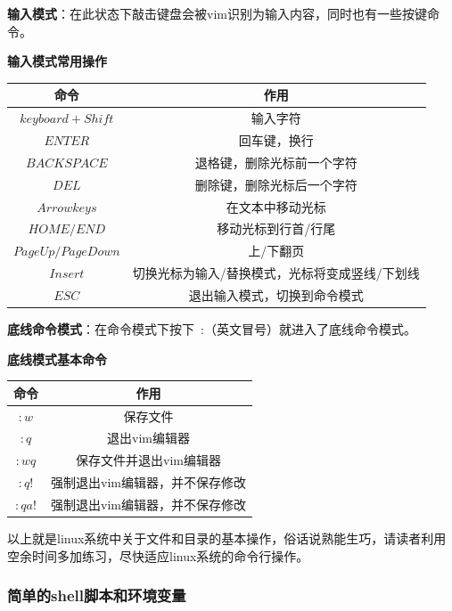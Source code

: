 \textbf{输入模式}：在此状态下敲击键盘会被vim识别为输入内容，同时也有一些按键命令。

\begin{center}
\textbf{输入模式常用操作}

	\begin{tabular}{cc}
		\toprule[1.5pt]
		命令 & 作用\\
		\midrule[1pt]
		$  keyboard+Shift    $		&输入字符\\
		$  ENTER    $		&回车键，换行\\
		$  BACK SPACE    $		&退格键，删除光标前一个字符\\
		$  DEL    $		&删除键，删除光标后一个字符\\
		$  Arrow keys    $		&在文本中移动光标\\
		$  HOME/END    $		&移动光标到行首/行尾\\
		$  Page Up/Page Down    $		&上/下翻页\\
		$  Insert    $		&切换光标为输入/替换模式，光标将变成竖线/下划线\\
		$  ESC    $		&退出输入模式，切换到命令模式\\
		\bottomrule[1.5pt]
	\end{tabular}
\end{center}

\textbf{底线命令模式}：在命令模式下按下 :（英文冒号）就进入了底线命令模式。

\begin{center}
\textbf{底线模式基本命令}

	\begin{tabular}{cc}
		\toprule[1.5pt]
		命令 & 作用\\
		\midrule[1pt]
		$  :w    $		&保存文件\\
		$  :q    $		&退出vim编辑器\\
		$  :wq    $		&保存文件并退出vim编辑器\\
		$  :q!    $		&强制退出vim编辑器，并不保存修改\\
		$  :qa!    $		&强制退出vim编辑器，并不保存修改\\
		\bottomrule[1.5pt]
	\end{tabular}
\end{center}

以上就是linux系统中关于文件和目录的基本操作，俗话说熟能生巧，请读者利用空余时间多加练习，尽快适应linux系统的命令行操作。

\subsubsection{简单的shell脚本和环境变量}

